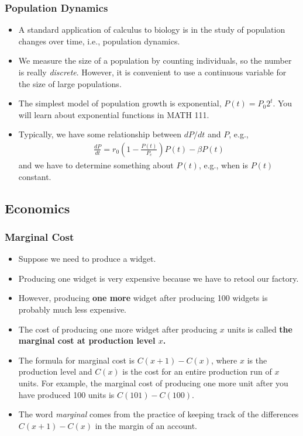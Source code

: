 \documentclass[serif,ignorenonframetext]{beamer}
\begin{document}
\begin{frame}
  \frametitle{Population Dynamics}
  \begin{itemize}[<+->]
  \item A standard application of calculus to biology is in the study
    of population changes over time, i.e., population dynamics.
  \item We measure the size of a population by counting individuals,
    so the number is really \textit{discrete}.  However, it is
    convenient to use a continuous
    variable for the size of large populations.
  \item The simplest model of population growth is exponential, $P(t)
    = P_0 2^t$.  You will learn about exponential functions in MATH 111.
  \item Typically, we have some relationship between $dP/dt$ and $P$,
    e.g., 
    \begin{align*}
      \frac{dP}{dt} = r_0 \left(1-\frac{P(t)}{P_c}\right) P(t)-\beta P(t)
    \end{align*}
    and we have to determine something about $P(t)$, e.g., when is $P(t)$
    constant.
  \end{itemize}
\end{frame}


\subsection{Economics}

\begin{frame}
  \frametitle{Marginal Cost}
  \begin{itemize}[<+->]
  \item Suppose we need to produce a widget.  
  \item Producing one widget is very expensive because we have to retool
    our factory.
  \item However, producing \textbf{one more} widget after producing 100
    widgets is probably much less expensive.
  \item The cost of producing one more widget after producing $x$ units
    is called \textbf{the marginal cost at production level $x$.}
  \item The formula for marginal cost is $C(x+1)-C(x)$, where $x$ is the
    production level and $C(x)$ is the cost for an entire production run
    of $x$ units.  For example, the marginal cost of producing one more 
    unit after you have produced 100 units is $C(101)-C(100)$.
  \item The word \textit{marginal} comes from the practice of keeping track
    of the differences $C(x+1)-C(x)$ in the margin of an account.
  \end{itemize}
\end{frame}
\end{document}

